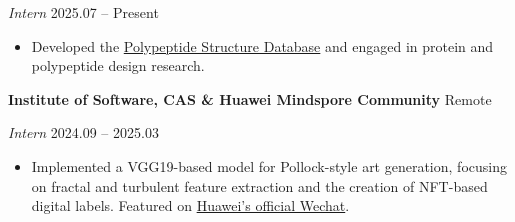 \documentclass[11pt]{article}
\begin{document}
	\textit{Intern} \hfill 2025.07 – Present
	\begin{itemize}[noitemsep, topsep=0pt, partopsep=0pt, parsep=0pt, leftmargin=*]
		\item Developed the \href{https://www.frcbs.tsinghua.edu.cn/cpdb/}{Polypeptide Structure Database} and engaged in protein and polypeptide design research.
	\end{itemize}
	
	\vspace{10pt}
	
	\textbf{Institute of Software, CAS \& Huawei Mindspore Community} \hfill Remote
	
	\textit{Intern} \hfill 2024.09 – 2025.03
	\begin{itemize}[noitemsep, topsep=0pt, partopsep=0pt, parsep=0pt, leftmargin=*]
		\item Implemented a VGG19-based model for Pollock-style art generation, focusing on fractal and turbulent feature extraction and the creation of NFT-based digital labels. Featured on \href{https://mp.weixin.qq.com/s/_N5oLsa0etJTxEOKRTt_4w}{Huawei's official Wechat}.
	\end{itemize}
	
	\vspace{10pt}
	
	\vspace{12pt}
	
\end{document}

